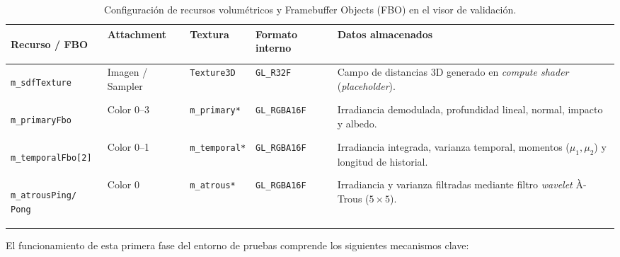\begin{table}[htbp]
  \centering
  \small
  \caption{Configuración de recursos volumétricos y Framebuffer Objects (FBO) en el visor de validación.}
  \label{tab:fbos}
  \begin{tabularx}{\textwidth}{|>{\bfseries\raggedright\arraybackslash}p{34mm}|>{\raggedright\arraybackslash}p{21mm}|>{\raggedright\arraybackslash}p{21mm}|>{\raggedright\arraybackslash}p{24mm}|X|}
    \hline
    \rowcolor{tablegray} Recurso / FBO & Attachment & Textura & Formato interno & Datos almacenados \\ \hline
    \texttt{m\_sdfTexture} & Imagen / Sampler & \texttt{Texture3D} & \texttt{GL\_R32F} & Campo de distancias 3D generado en \textit{compute shader} (\textit{placeholder}). \\ \hline
    \texttt{m\_primaryFbo} & Color 0--3 & \texttt{m\_primary*} & \texttt{GL\_RGBA16F} & Irradiancia demodulada, profundidad lineal, normal, impacto y albedo. \\ \hline
    \texttt{m\_temporalFbo[2]} & Color 0--1 & \texttt{m\_temporal*} & \texttt{GL\_RGBA16F} & Irradiancia integrada, varianza temporal, momentos ($\mu_1, \mu_2$) y longitud de historial. \\ \hline
    \texttt{m\_atrousPing/} \newline \texttt{Pong} & Color 0 & \texttt{m\_atrous*} & \texttt{GL\_RGBA16F} & Irradiancia y varianza filtradas mediante filtro \textit{wavelet} À-Trous ($5\times 5$). \\ \hline
  \end{tabularx}
\end{table}

El funcionamiento de esta primera fase del entorno de pruebas comprende los siguientes mecanismos clave:

